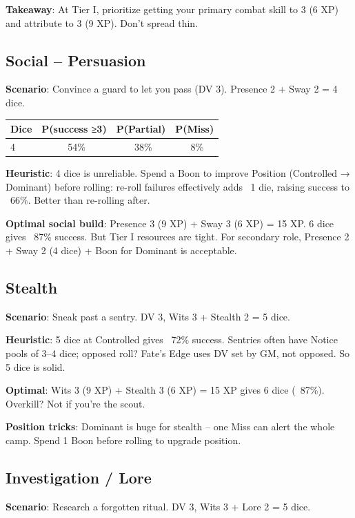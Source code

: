 \documentclass[11pt]{article}
\begin{document}
\textbf{Takeaway}: At Tier I, prioritize getting your primary combat skill to 3 (6 XP) and attribute to 3 (9 XP). Don't spread thin.

\subsection{Social – Persuasion}
\textbf{Scenario}: Convince a guard to let you pass (DV 3). Presence 2 + Sway 2 = 4 dice.

\begin{table}[h]
\centering
\begin{tabular}{lccc}
\toprule
\textbf{Dice} & \textbf{P(success ≥3)} & \textbf{P(Partial)} & \textbf{P(Miss)} \\
\midrule
4 & ~54\% & ~38\% & ~8\% \\
\bottomrule
\end{tabular}
\end{table}

\textbf{Heuristic}: 4 dice is unreliable. Spend a Boon to improve Position (Controlled → Dominant) before rolling: re-roll failures effectively adds ~1 die, raising success to ~66\%. Better than re-rolling after.

\textbf{Optimal social build}: Presence 3 (9 XP) + Sway 3 (6 XP) = 15 XP. 6 dice gives ~87\% success. But Tier I resources are tight. For secondary role, Presence 2 + Sway 2 (4 dice) + Boon for Dominant is acceptable.

\subsection{Stealth}
\textbf{Scenario}: Sneak past a sentry. DV 3, Wits 3 + Stealth 2 = 5 dice.

\textbf{Heuristic}: 5 dice at Controlled gives ~72\% success. Sentries often have Notice pools of 3–4 dice; opposed roll? Fate's Edge uses DV set by GM, not opposed. So 5 dice is solid.

\textbf{Optimal}: Wits 3 (9 XP) + Stealth 3 (6 XP) = 15 XP gives 6 dice (~87\%). Overkill? Not if you're the scout.

\textbf{Position tricks}: Dominant is huge for stealth – one Miss can alert the whole camp. Spend 1 Boon before rolling to upgrade position.

\subsection{Investigation / Lore}
\textbf{Scenario}: Research a forgotten ritual. DV 3, Wits 3 + Lore 2 = 5 dice.
\end{document}
